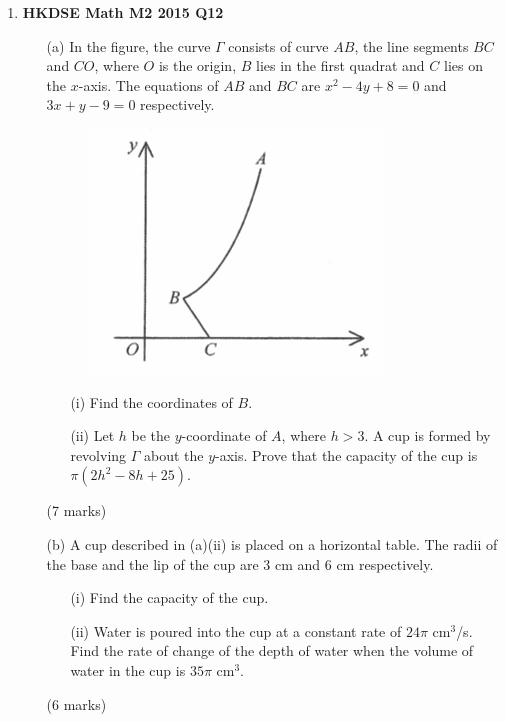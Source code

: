 \documentclass[12pt]{article}
\begin{document}
\begin{enumerate}
	\item \textbf{HKDSE Math M2 2015 Q12}
	\begin{enumerate}
		\item [(a)]In the figure, the curve $\Gamma$ consists of curve $AB$, the line segments $BC$ and $CO$, where $O$ is the origin, $B$ lies in the first quadrat and $C$ lies on the $x$-axis. The equations of $AB$ and $BC$ are $x^2-4y+8 = 0$ and $3x+y-9=0$ respectively.
			\begin{figure}[H]
				\centering
				\includegraphics[width = .5\linewidth]{2015Figure1}
			\end{figure}
		\begin{enumerate}
			\item [(i)]Find the coordinates of $B$. 
			\item [(ii)]Let $h$ be the $y$-coordinate of $A$, where $h > 3$. A cup is formed by revolving $\Gamma$ about the $y$-axis. Prove that the capacity of the cup is $\pi(2h^2-8h+25)$.
		\end{enumerate}
		(7 marks)
		\item [(b)]A cup described in (a)(ii) is placed on a horizontal table. The radii of the base and the lip of the cup are 3 cm and 6 cm respectively.
		\begin{enumerate}
			\item [(i)]Find the capacity of the cup.
			\item [(ii)]Water is poured into the cup at a constant rate of $24\pi$ cm$^3$/s. Find the rate of change of the depth of water when the volume of water in the cup is $35\pi$ cm$^3$.
		\end{enumerate}
		(6 marks)
	\end{enumerate}
\end{enumerate}
\end{document}
